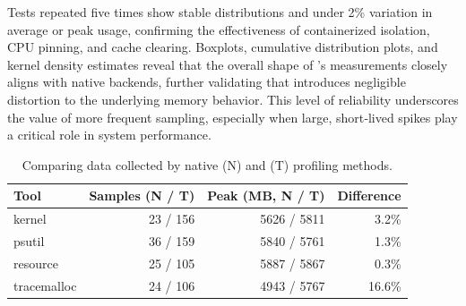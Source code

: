 Tests repeated five times show stable distributions and under 2\% variation in average or peak usage, confirming the effectiveness of containerized isolation, \ac{CPU} pinning, and cache clearing.
Boxplots, cumulative distribution plots, and kernel density estimates reveal that the overall shape of \traceq's measurements closely aligns with native backends, further validating that \traceq introduces negligible distortion to the underlying memory behavior.
This level of reliability underscores the value of more frequent sampling, especially when large, short‑lived spikes play a critical role in system performance.

\begin{table}[!ht]
    \centering
    \caption{Comparing data collected by native (N) and \traceq (T) profiling methods.}
    \label{tab:mmc-metrics}
    \begin{tabular}{lrrr}
        \toprule
        \textbf{Tool} & \textbf{Samples (N / T)} & \textbf{Peak (MB, N / T)} & \textbf{Difference} \\
        \midrule
        kernel        & 23 / 156                 & 5626 / 5811               & 3.2\%               \\
        psutil        & 36 / 159                 & 5840 / 5761               & 1.3\%               \\
        resource      & 25 / 105                 & 5887 / 5867               & 0.3\%               \\
        tracemalloc   & 24 / 106                 & 4943 / 5767               & 16.6\%              \\
        \bottomrule
    \end{tabular}
\end{table}